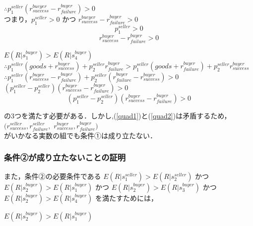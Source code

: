 \documentclass[twocolumn, a4j]{article}
\begin{document}
$ \therefore p^{seller}_1 (r^{bueyer}_{success} - r^{buyer}_{failure}) > 0$\\

つまり，$ p^{seller}_1 > 0$ かつ $r^{bueyer}_{success} - r^{buyer}_{failure} > 0$\\

\begin{equation}
   p^{seller}_1 > 0
\end{equation}
\begin{equation}
   \label{quad2}
   r^{buyer}_{success} - r^{buyer}_{failure} > 0
\end{equation}

$ E(R|s^{buyer}_1) > E(R|s^{buyer}_4)$ \\

$\therefore p^{seller}_1 (goods + r^{buyer}_{success}) + p^{seller}_2 r^{buyer}_{failure} > p^{seller}_1 (goods + r^{buyer}_{failure}) + p^{seller}_2 r^{buyer}_{success}$ \\

$\therefore p^{seller}_1(r^{buyer}_{success} - r^{buyer}_{failure}) + p^{seller}_2(r^{buyer}_{failure} - r^{buyer}_{success}) > 0$ \\

$ (p^{seller}_1 - p^{seller}_2)(r^{buyer}_{success} - r^{buyer}_{failure}) > 0$\\

\begin{equation}
\label{quad3}
  (p^{seller}_1 - p^{seller}_2)(r^{buyer}_{success} - r^{buyer}_{failure}) > 0
\end{equation}

の3つを満たす必要がある．しかし,(\ref{quad1})と(\ref{quad2})は矛盾するため，
$(r^{seller}_{success}, r^{seller}_{failure}, $
$r^{buyer}_{success}, r^{buyer}_{failure})$ \\
がいかなる実数の組でも条件①は成り立たない． \\


\subsubsection{条件②が成り立たないことの証明}
また，条件②の必要条件である
$E(R|s^{seller}_1)>E(R|s^{seller}_2)$
かつ
$E(R|s^{buyer}_2)>E(R|s^{buyer}_1)$
かつ
$E(R|s^{buyer}_2) > E(R|s^{buyer}_3)$
かつ
$E(R|s^{buyer}_2) > E(R|s^{buyer}_4)$
を満たすためには，

$ E(R|s^{buyer}_2) > E(R|s^{buyer}_1)$ \\
\end{document}
